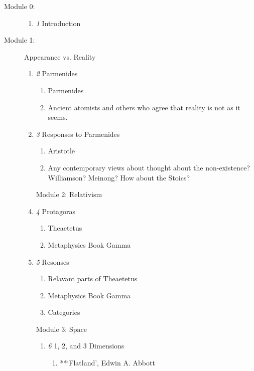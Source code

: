 \documentclass[article,oneside]{memoir}
\begin{document}
\begin{description}
\item[Module 0:] 
\begin{enumerate}
\item \textit{1} Introduction
\end{enumerate}

\item[Module 1:] Appearance vs. Reality  
\begin{enumerate}
\item \textit{2} Parmenides
\begin{enumerate}
\item Parmenides
\item Ancient atomists and others who agree that reality is not as it seems.
\end{enumerate}

\item \textit{3} Responses to Parmenides
\begin{enumerate}
\item Aristotle 
\item Any contemporary views about thought about the non-existence? Williamson? Meinong? How about the Stoics? 
\end{enumerate}

\item[Module 2:] Relativism

\item \textit{4} Protagoras 
\begin{enumerate}
\item Theaetetus
\item Metaphysics Book Gamma
\end{enumerate}

\item \textit{5} Resonses 
\begin{enumerate}
\item Relavant parts of Theaetetus
\item Metaphysics Book Gamma
\item Categories
\end{enumerate}

\item[Module 3:] Space 
\begin{enumerate}
\item \textit{6} 1, 2, and 3 Dimensions
\begin{enumerate}
\item **`Flatland', Edwin A. Abbott
\end{enumerate}


\end{enumerate}
\end{enumerate}
\end{description}
\end{document}
